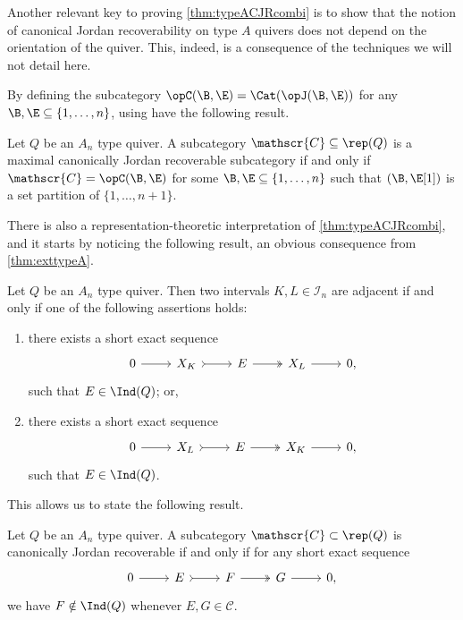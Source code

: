 Another relevant key to proving \cref{thm:typeACJRcombi} is to show that the notion of canonical Jordan recoverability on type $A$ quivers does not depend on the orientation of the quiver. This, indeed, is a consequence of the techniques we will not detail here.

By defining the subcategory $\opC(\B,\E) = \Cat(\opJ(\B,\E))$ for any $\B,\E \subseteq \{1,\ldots,n\}$, using  have the following result. 

\begin{theorem} \label{thm:CJRmaxcomb}
    Let $Q$ be an $A_n$ type quiver. A subcategory $\mathscr{C} \subseteq \rep(Q)$ is a maximal canonically Jordan recoverable subcategory if and only if $\mathscr{C} = \opC(\B,\E)$ for some $\B,\E \subseteq \{1,\ldots,n\}$ such that $(\B,\E[1])$ is a set partition of $\{1,\ldots,n+1\}$.
\end{theorem}

There is also a representation-theoretic interpretation of \cref{thm:typeACJRcombi}, and it starts by noticing the following result, an obvious consequence from \cref{thm:exttypeA}.

\begin{lemma} \label{lem:adj=arrow} Let $Q$ be an $A_n$ type quiver. Then two intervals $K,L \in \mathcal{I}_n$ are adjacent if and only if one of the following assertions holds:
\begin{enumerate}[label=$\bullet$, itemsep=1mm]
    \item there exists a short exact sequence \[\begin{tikzcd}
	0 & X_K & E  & X_L&  0,
	\arrow[from=1-1, to=1-2]
	\arrow[tail, from=1-2, to=1-3]
	\arrow[two heads,from=1-3, to=1-4]
	\arrow[from=1-4, to=1-5]
\end{tikzcd} \] such that $E \in \Ind(Q)$; or,
    \item there exists a short exact sequence \[\begin{tikzcd}
	0 & X_L & E  & X_K&  0,
	\arrow[from=1-1, to=1-2]
	\arrow[tail, from=1-2, to=1-3]
	\arrow[two heads,from=1-3, to=1-4]
	\arrow[from=1-4, to=1-5]
\end{tikzcd} \] such that $E \in \Ind(Q)$.
\end{enumerate}
\end{lemma}

This allows us to state the following result.

 \begin{theorem} \label{thm:CJRreptheory}
     Let $Q$ be an $A_n$ type quiver. A subcategory $\mathscr{C} \subset \rep(Q)$ is canonically Jordan recoverable if and only if for any short exact sequence \[\begin{tikzcd}
	0 & E & F  & G &  0,
	\arrow[from=1-1, to=1-2]
	\arrow[tail, from=1-2, to=1-3]
	\arrow[two heads,from=1-3, to=1-4]
	\arrow[from=1-4, to=1-5]
\end{tikzcd}\] we have $F \notin \Ind(Q)$ whenever $E,G \in \mathscr{C}$.
 \end{theorem}

